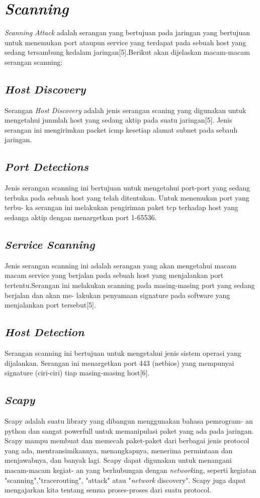 \section{\emph{Scanning}}
\emph{Scanning Attack} adalah serangan yang bertujuan pada jaringan yang bertujuan
untuk menemukan port ataupun service yang terdapat pada sebuah host yang sedang
tersambung kedalam jaringan[5].Berikut akan dijelaskan macam-macam serangan
scanning:

\subsection{\emph{Host Discovery}}
Serangan \emph{Host Discovery} adalah jenis serangan scaning yang digunakan untuk
mengetahui junmlah host yang sedang aktip pada suatu jaringan[5]. Jenis serangan
ini mengirimkan packet icmp kesetiap alamat subnet pada sebauh jaringan.


\subsection{\emph{Port Detections}}
Jenis serangan scanning ini bertujuan untuk mengetahui port-port yang sedang
terbuka pada sebuah host yang telah ditentukan. Untuk menemukan port yang terbu-
ka serangan ini melakukan pengiriman paket tcp terhadap host yang sedanga aktip
dengan menargetkan port 1-65536.

\subsection{\emph{Service Scanning}}
Jenis serangan scanning ini adalah serangan yang akan mengetahui macam
macam service yang berjalan pada sebuah host yang menjalankan port tertentu.Serangan
ini melakukan scanning pada masing-masing port yang sedang berjalan dan akan me-
lakukan penyamaan signature pada software yang menjalankan port tersebut[5].

\newpage
\subsection{\emph{Host Detection}}
Serangan scanning ini bertujuan untuk mengetahui jenis sistem operasi yang
dijalankan. Serangan ini menargetkan port 443 (netbios) yang mempunyai signature
(ciri-ciri) tiap masing-masing host[6].

\subsection{\emph{Scapy}}
Scapy adalah suatu library yang dibangun menggunakan bahasa pemrogram-
an python dan sangat powerfull untuk memanipulasi paket yang ada pada jaringan.
Scapy mampu membuat dan memecah paket-paket dari berbagai jenis protocol yang
ada, mentransimikannya, menangkapnya, menerima permintaan dan menjawabnya,
dan banyak lagi. Scapy dapat digunakan untuk menangani macam-macam kegiat-
an yang berhubungan dengan \emph{network}ing, seperti kegiatan "scanning","tracerouting",
"attack" atau "\emph{network} discovery". Scapy juga dapat mengajarkan kita tentang semua
proses-proses dari suatu protocol.


\begin{comment}

\end{comment}
